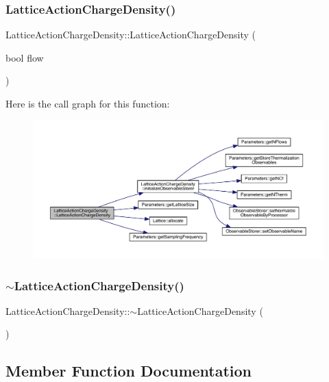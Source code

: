 \subsubsection{\texorpdfstring{LatticeActionChargeDensity()}{LatticeActionChargeDensity()}}
{\footnotesize\ttfamily Lattice\+Action\+Charge\+Density\+::\+Lattice\+Action\+Charge\+Density (\begin{DoxyParamCaption}\item[{bool}]{flow }\end{DoxyParamCaption})}

Here is the call graph for this function\+:
\nopagebreak
\begin{figure}[H]
\begin{center}
\leavevmode
\includegraphics[width=350pt]{class_lattice_action_charge_density_acda2a43db75cca34586441d4ac7ec39e_cgraph}
\end{center}
\end{figure}
\mbox{\label{class_lattice_action_charge_density_a72679dfadb215889401f5403909b7b93}} 
\subsubsection{\texorpdfstring{$\sim$LatticeActionChargeDensity()}{~LatticeActionChargeDensity()}}
{\footnotesize\ttfamily Lattice\+Action\+Charge\+Density\+::$\sim$\+Lattice\+Action\+Charge\+Density (\begin{DoxyParamCaption}{ }\end{DoxyParamCaption})}



\subsection{Member Function Documentation}
\mbox{\label{class_lattice_action_charge_density_a3dddc75188042c645fbdd1c8b3e80c8a}} 
